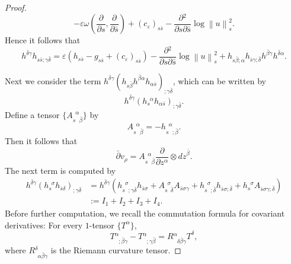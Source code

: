 \documentclass{amsart}
\theoremstyle{definition}
\numberwithin{equation}{section}
\begin{document}
\begin{proof}
\begin{equation*}
-
{\varepsilon}\omega{\left({{\frac{\partial{}}{\partial{s}}},{\frac{\partial{}}{\partial{\bar s}}}}\right)}
+
{\left({c_{\varepsilon}}\right)}_{s\bar s}
-
{\frac{\partial{^2}}{\partial{s\partial\bar{s}}}}\log{\left\|{u}\right\|}_s^2.
\end{equation*}
Hence it follows that
\begin{equation}\label{E:first_term}
h^{\bar\delta\gamma}h_{s\bar{s};\gamma\bar\delta}
=
{\varepsilon}{\left({h_{s\bar s}-g_{s\bar s}+(c_{\varepsilon})_{s\bar s}}\right)}
-
{\frac{\partial{^2}}{\partial{s\partial\bar{s}}}}\log{\left\|{u}\right\|}_s^2
+
h_{s\bar\beta;\alpha}
h_{\bar{s}\gamma;\bar\delta}
h^{\bar\beta\gamma}h^{\bar\delta\alpha}.
\end{equation}

Next we consider the term 
$h^{\bar\delta\gamma}{\left({h_{s\bar\beta}h^{\bar\beta\alpha}h_{\alpha\bar{s}}}\right)}_{;\gamma\bar\delta}$, which can be written by 
$$
h^{\bar\delta\gamma}{\left({h{_{{s}\phantom{{\alpha}}{}}^{\phantom{{s}}{\alpha}}} h_{\alpha\bar{s}}}\right)}_{;\gamma\bar\delta}.
$$
Define a tensor $\{A{_{{s}\phantom{{\alpha}}{\bar\beta}}^{\phantom{{s}}{\alpha}}}\}$ by 
$$
A{_{{s}\phantom{{\alpha}}{\bar\beta}}^{\phantom{{s}}{\alpha}}}=-h{_{{s}\phantom{{\alpha}}{;\bar\beta}}^{\phantom{{s}}{\alpha}}}.
$$ 
Then it follows that
\begin{equation*}
\bar\partial{v_\rho}=A{_{{s}\phantom{{\alpha}}{\bar\beta}}^{\phantom{{s}}{\alpha}}}{\frac{\partial{}}{\partial{z^\alpha}}}\otimes{dz}^{\bar\beta}.
\end{equation*}
The next term is computed by
\begin{align*}
h^{\bar\delta\gamma}{\left({h{_{{s}\phantom{{\sigma}}{}}^{\phantom{{s}}{\sigma}}}h_{\bar{s}\delta}}\right)}_{;\gamma\bar\delta}
	& = h^{\bar\delta\gamma}{\left({
	h{_{{s}\phantom{{\sigma}}{;\gamma\bar\delta}}^{\phantom{{s}}{\sigma}}}h_{\bar{s}\sigma}
	+A{_{{s}\phantom{{\sigma}}{\bar\delta}}^{\phantom{{s}}{\sigma}}}A_{\bar{s}\sigma\gamma}
	+h{_{{s}\phantom{{\sigma}}{;\bar\delta}}^{\phantom{{s}}{\sigma}}}h_{\bar{s}\sigma;\bar\delta}
	+h{_{{s}\phantom{{\sigma}}{}}^{\phantom{{s}}{\sigma}}}A_{\bar{s}\sigma\gamma;\bar\delta}
	}\right)}
	\\
	& := I_1+I_2+I_3+I_4.
\end{align*}
Before further computation, we recall the commutation formula for covariant derivatives: For every $1$-tensor $\{T^\alpha\}$,
\begin{equation} \label{E:commutation}
T{_{{}\phantom{{\alpha}}{;\bar\beta\gamma}}^{\phantom{{}}{\alpha}}}
	-T{_{{}\phantom{{\alpha}}{;\gamma\bar\beta}}^{\phantom{{}}{\alpha}}}
	=R{_{{}\phantom{{\alpha}}{\delta\bar\beta\gamma}}^{\phantom{{}}{\alpha}}}T^\delta,
\end{equation}
where $R{_{{}\phantom{{\delta}}{\alpha\bar\beta\gamma}}^{\phantom{{}}{\delta}}}$ is the Riemann curvature tensor.
\medskip


\end{proof}
\end{document}
